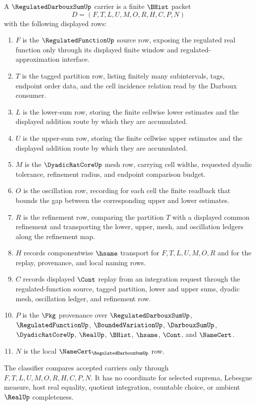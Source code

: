 \begin{definition}
\label{def:regulated-darboux-sum-carrier}
A $\RegulatedDarbouxSumUp$ carrier is a finite $\BHist$ packet
$$
D=(F,T,L,U,M,O,R,H,C,P,N)
$$
with the following displayed rows:
\begin{enumerate}
\item $F$ is the $\RegulatedFunctionUp$ source row, exposing the regulated real function only through its displayed finite window and regulated-approximation interface.
\item $T$ is the tagged partition row, listing finitely many subintervals, tags, endpoint order data, and the cell incidence relation read by the Darboux consumer.
\item $L$ is the lower-sum row, storing the finite cellwise lower estimates and the displayed addition route by which they are accumulated.
\item $U$ is the upper-sum row, storing the finite cellwise upper estimates and the displayed addition route by which they are accumulated.
\item $M$ is the $\DyadicRatCoreUp$ mesh row, carrying cell widths, requested dyadic tolerance, refinement radius, and endpoint comparison budget.
\item $O$ is the oscillation row, recording for each cell the finite readback that bounds the gap between the corresponding upper and lower estimates.
\item $R$ is the refinement row, comparing the partition $T$ with a displayed common refinement and transporting the lower, upper, mesh, and oscillation ledgers along the refinement map.
\item $H$ records componentwise $\hsame$ transport for $F,T,L,U,M,O,R$ and for the replay, provenance, and local naming rows.
\item $C$ records displayed $\Cont$ replay from an integration request through the regulated-function source, tagged partition, lower and upper sums, dyadic mesh, oscillation ledger, and refinement row.
\item $P$ is the $\Pkg$ provenance over $\RegulatedDarbouxSumUp$, $\RegulatedFunctionUp$, $\BoundedVariationUp$, $\DarbouxSumUp$, $\DyadicRatCoreUp$, $\RealUp$, $\BHist$, $\hsame$, $\Cont$, and $\NameCert$.
\item $N$ is the local $\NameCert_{\RegulatedDarbouxSumUp}$ row.
\end{enumerate}
The classifier compares accepted carriers only through $F,T,L,U,M,O,R,H,C,P,N$. It has no coordinate for selected suprema, Lebesgue measure, host real equality, quotient integration, countable choice, or ambient $\RealUp$ completeness.
\end{definition}

